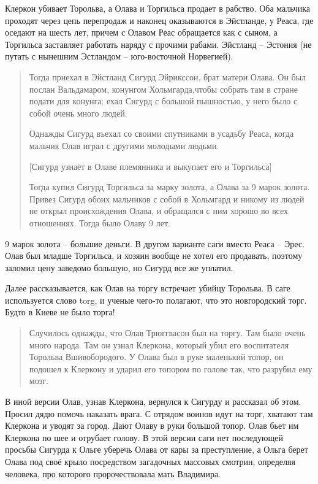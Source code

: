 Клеркон убивает Торольва, а Олава и Торгильса продает в рабство. Оба мальчика проходят через цепь перепродаж и наконец оказываются в Эйстланде, у Реаса, где оседают на шесть лет, причем с Олавом Реас обращается как с сыном, а Торгильса заставляет работать наряду с прочими рабами. Эйстланд – Эстония (не путать с нынешним Эстландом – юго-восточной Норвегией). 

\begin{quotation}
Тогда приехал в Эйстланд Сигурд Эйрикссон, брат матери Олава. Он был послан Вальдамаром, конунгом Хольмгарда,чтобы собрать там в стране подати для конунга; ехал Сигурд с большой пышностью, у него было с собой очень много людей.

Однажды Сигурд въехал со своими спутниками в усадьбу Реаса, когда мальчик Олав играл с другими молодыми людьми. 

[Сигурд узнаёт в Олаве племянника и выкупает его и Торгильса] 

Тогда купил Сигурд Торгильса за марку золота, а Олава за 9 марок золота. Привез Сигурд обоих мальчиков с собой в Хольмгард и никому из людей не открыл происхождения Олава, и обращался с ним хорошо во всех отношениях. Тогда было Олаву 9 лет.
\end{quotation}

9 марок золота – большие деньги. В другом варианте саги вместо Реаса – Эрес. Олав был младше Торгильса, и хозяин вообще не хотел его продавать, поэтому заломил цену заведомо большую, но Сигурд все же уплатил.

Далее рассказывается, как Олав на торгу встречает убийцу Торольва. В саге используется слово torg, и ученые чего-то полагают, что это новгородский торг. Будто в Киеве не было торга!

\begin{quotation}
Случилось однажды, что Олав Трюггвасон был на торгу. Там было очень много народа. Там он узнал Клеркона, который убил его воспитателя Торольва Вшивобородого. У Олава был в руке маленький топор, он подошел к Клеркону и ударил его топором по голове так, что разрубил ему мозг.
\end{quotation}

В иной версии Олав, узнав Клеркона, вернулся к Сигурду и рассказал об этом. Просил дядю помочь наказать врага. С отрядом воинов идут на торг, хватают там Клеркона и уводят за город. Дают Олаву в руки большой топор. Олав бьет им Клеркона по шее и отрубает голову. В этой версии саги нет последующей просьбы Сигурда к Ольге уберечь Олава от кары за преступление, а Ольга берет Олава под своё крыло посредством загадочных массовых смотрин, определяя человека, про которого пророчествовала мать Владимира.

